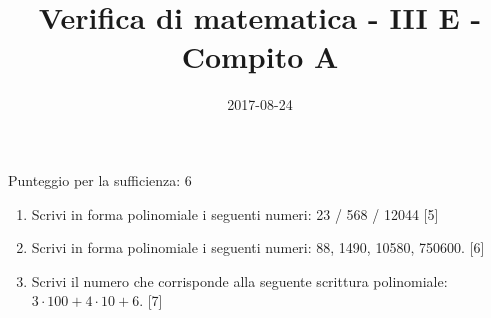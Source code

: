 \documentclass[11pt,fleqn]{article} %
\title{Verifica di matematica - III E - Compito A}
\date{2017-08-24}
\newcommand{\T}{\cdot}
\begin{document}
\maketitle
Punteggio per la sufficienza: 6
\begin{enumerate}

\item Scrivi in forma polinomiale i seguenti numeri: 23 / 568 / 12044 [5] 
\item Scrivi in forma polinomiale i seguenti numeri: 88, 1490, 10580, 750600. [6] 
\item Scrivi il numero che corrisponde alla seguente scrittura polinomiale: $3\T100 + 4\T10 + 6$. [7] 
\end{enumerate}
\end{document}
